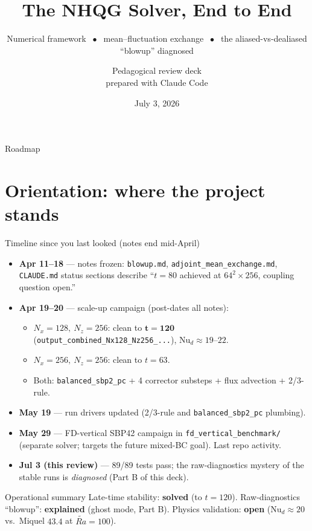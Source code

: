 \documentclass[aspectratio=169,10pt]{beamer}
\title[NHQG framework \& the ghost-mode diagnosis]{The NHQG Solver, End to End}
\subtitle{Numerical framework $\;\bullet\;$ mean--fluctuation exchange $\;\bullet\;$
the aliased-vs-dealiased ``blowup'' diagnosed}
\author[NHQG review]{Pedagogical review deck \\ \small prepared with Claude Code}
\date{July 3, 2026}
\newcommand{\Rat}{\widetilde{Ra}}
\newcommand{\file}[1]{\textcolor{blue!60!black}{\texttt{#1}}}
\newcommand{\Nud}{\mathrm{Nu}_{d}}
\begin{document}
\begin{frame}
  \titlepage
\end{frame}

\begin{frame}{Roadmap}
  \tableofcontents[hideallsubsections]
\end{frame}

\section{Orientation: where the project stands}

\begin{frame}{Timeline since you last looked (notes end mid-April)}
  \begin{itemize}
    \item \textbf{Apr 11--18} --- notes frozen: \file{blowup.md}, \file{adjoint\_mean\_exchange.md},
      \file{CLAUDE.md} status sections describe ``$t=80$ achieved at $64^2\times256$,
      coupling question open.''
    \item \textbf{Apr 19--20} --- scale-up campaign (post-dates all notes):
      \begin{itemize}
        \item $N_x{=}128,\ N_z{=}256$: clean to $\mathbf{t=120}$
          (\file{output\_combined\_Nx128\_Nz256\_...}), $\Nud\approx 19$--$22$.
        \item $N_x{=}256,\ N_z{=}256$: clean to $t=63$.
        \item Both: \texttt{balanced\_sbp2\_pc} + 4 corrector substeps + flux advection + 2/3-rule.
      \end{itemize}
    \item \textbf{May 19} --- run drivers updated (2/3-rule and \texttt{balanced\_sbp2\_pc} plumbing).
    \item \textbf{May 29} --- FD-vertical SBP42 campaign in \file{fd\_vertical\_benchmark/}
      (separate solver; targets the future mixed-BC goal). Last repo activity.
    \item \textbf{Jul 3 (this review)} --- 89/89 tests pass; the raw-diagnostics mystery
      of the stable runs is \emph{diagnosed} (Part B of this deck).
  \end{itemize}
  \begin{alertblock}{Operational summary}
    Late-time stability: \textbf{solved} (to $t=120$).\quad
    Raw-diagnostics ``blowup'': \textbf{explained} (ghost mode, Part B).\quad
    Physics validation: \textbf{open} ($\Nud\approx20$ vs.\ Miquel $43.4$ at $\Rat=100$).
  \end{alertblock}
\end{frame}
\end{document}
